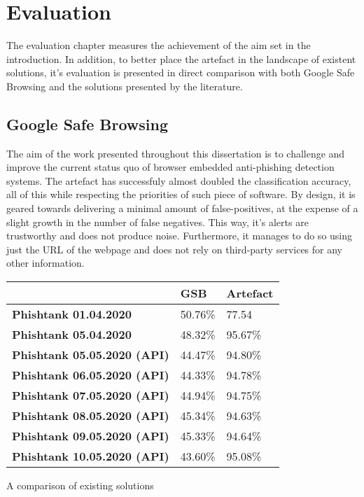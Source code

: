 \chapter{Evaluation}
The evaluation chapter measures the achievement of the aim set in the introduction. In addition, to better place the artefact in the landscape of existent solutions, it's evaluation is presented in direct comparison with both Google Safe Browsing and the solutions presented by the literature.

\section{Google Safe Browsing}
The aim of the work presented throughout this dissertation is to challenge and improve the current status quo of browser embedded anti-phishing detection systems. The artefact has successfuly almost doubled the classification accuracy, all of this while respecting the priorities of such piece of software. By design, it is geared towards delivering a minimal amount of false-positives, at the expense of a slight growth in the number of false negatives. This way, it's alerts are trustworthy and does not produce noise. Furthermore, it manages to do so using just the URL of the webpage and does not rely on third-party services for any other information.

\begin{singlespace}
    \small
    \begin{center}
        \label{tab:ARTEFACT_VS_GSB}
        \begin{tabular}{ | m{14em} | m{5em} | m{5em} |}
            \hline
                                                & \textbf{GSB} & \textbf{Artefact} \\
            \hline
            \textbf{Phishtank 01.04.2020}       & 50.76\%      & 77.54             \\
            \hline
            \textbf{Phishtank 05.04.2020}       & 48.32\%      & 95.67\%           \\
            \hline
            \textbf{Phishtank 05.05.2020 (API)} & 44.47\%      & 94.80\%           \\
            \hline
            \textbf{Phishtank 06.05.2020 (API)} & 44.33\%      & 94.78\%           \\
            \hline
            \textbf{Phishtank 07.05.2020 (API)} & 44.94\%      & 94.75\%           \\
            \hline
            \textbf{Phishtank 08.05.2020 (API)} & 45.34\%      & 94.63\%           \\
            \hline
            \textbf{Phishtank 09.05.2020 (API)} & 45.33\%      & 94.64\%           \\
            \hline
            \textbf{Phishtank 10.05.2020 (API)} & 43.60\%      & 95.08\%           \\
            \hline
        \end{tabular}
        \captionsetup{type=table}\caption{A comparison of existing solutions \citep{INTELLIGENT_PHISHING_ANFIS}}
    \end{center}
\end{singlespace}

